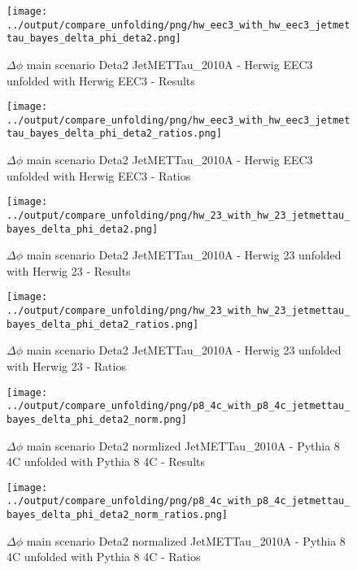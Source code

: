 \documentclass[11pt]{book}
\begin{document}
\begin{figure}[ht]
\centering
\texttt{[image: ../output/compare\_unfolding/png/hw\_eec3\_with\_hw\_eec3\_jetmettau\_bayes\_delta\_phi\_deta2.png]}
\caption{$\Delta\phi$ main scenario Deta2 JetMETTau\_2010A - Herwig EEC3 unfolded with Herwig EEC3 - Results}
\label{hw_eec3_hw_eec3_jetmettau_bayes_delta_phi_deta2_a}
\end{figure}

\begin{figure}[ht]
\centering
\texttt{[image: ../output/compare\_unfolding/png/hw\_eec3\_with\_hw\_eec3\_jetmettau\_bayes\_delta\_phi\_deta2\_ratios.png]}
\caption{$\Delta\phi$ main scenario Deta2 JetMETTau\_2010A - Herwig EEC3 unfolded with Herwig EEC3 - Ratios}
\label{hw_eec3_hw_eec3_jetmettau_bayes_delta_phi_deta2_b}
\end{figure}

\begin{figure}[ht]
\centering
\texttt{[image: ../output/compare\_unfolding/png/hw\_23\_with\_hw\_23\_jetmettau\_bayes\_delta\_phi\_deta2.png]}
\caption{$\Delta\phi$ main scenario Deta2 JetMETTau\_2010A - Herwig 23 unfolded with Herwig 23 - Results}
\label{hw_23_hw_23_jetmettau_bayes_delta_phi_deta2_a}
\end{figure}

\begin{figure}[ht]
\centering
\texttt{[image: ../output/compare\_unfolding/png/hw\_23\_with\_hw\_23\_jetmettau\_bayes\_delta\_phi\_deta2\_ratios.png]}
\caption{$\Delta\phi$ main scenario Deta2 JetMETTau\_2010A - Herwig 23 unfolded with Herwig 23 - Ratios}
\label{hw_23_hw_23_jetmettau_bayes_delta_phi_deta2_b}
\end{figure}



\begin{figure}[ht]
\centering
\texttt{[image: ../output/compare\_unfolding/png/p8\_4c\_with\_p8\_4c\_jetmettau\_bayes\_delta\_phi\_deta2\_norm.png]}
\caption{$\Delta\phi$ main scenario Deta2 normlized JetMETTau\_2010A - Pythia 8 4C unfolded with Pythia 8 4C - Results}
\label{p8_p8_jetmettau_bayes_delta_phi_deta2_norm_a}
\end{figure}

\begin{figure}[ht]
\centering
\texttt{[image: ../output/compare\_unfolding/png/p8\_4c\_with\_p8\_4c\_jetmettau\_bayes\_delta\_phi\_deta2\_norm\_ratios.png]}
\caption{$\Delta\phi$ main scenario Deta2 normalized JetMETTau\_2010A - Pythia 8 4C unfolded with Pythia 8 4C - Ratios}
\label{p8_p8_jetmettau_bayes_delta_phi_deta2_norm_b}
\end{figure}
\end{document}
